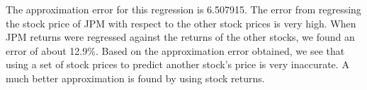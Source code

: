\documentclass{article}
\begin{document}
The approximation error for this regression is 6.507915. The error from regressing the stock price of JPM with respect to the other stock prices is very high. When JPM returns were regressed against the returns of the other stocks, we found an error of about 12.9\%. Based on the approximation error obtained, we see that using a set of stock prices to predict another stock's price is very inaccurate. A much better approximation is found by using stock returns.
\end{document}
